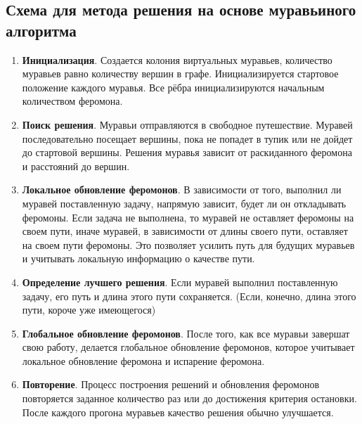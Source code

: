 \documentclass[12pt, a4paper]{article}
\begin{document}
\subsection{Схема для метода решения на основе муравьиного алгоритма}
\begin{enumerate}
	\item \textbf{Инициализация}. Создается колония 
	виртуальных муравьев, количество муравьев 
	равно количеству вершин в графе. 
	Инициализируется стартовое положение каждого 
	муравья. Все рёбра инициализируются начальным 
	количеством феромона.
	\item \textbf{Поиск решения}. Муравьи 
	отправляются в свободное путешествие. Муравей 
	последовательно посещает вершины, пока не 
	попадет в тупик или не дойдет до стартовой 
	вершины. Решения муравья зависит от раскиданного 
	феромона и расстояний до вершин.
	\item \textbf{Локальное обновление феромонов}. В 
	зависимости от того, выполнил ли муравей 
	поставленную задачу, напрямую зависит, будет ли 
	он откладывать феромоны. Если задача не 
	выполнена, то муравей не оставляет феромоны на 
	своем пути, иначе муравей, в зависимости от 
	длины своего пути, оставляет на своем пути 
	феромоны. Это позволяет усилить путь для будущих 
	муравьев и учитывать локальную информацию о 
	качестве пути.
	\item \textbf{Определение лучшего решения}. Если 
	муравей выполнил поставленную задачу, его путь и 
	длина этого пути сохраняется. (Если, конечно, 
	длина этого пути, короче уже имеющегося)
	\item \textbf{Глобальное обновление феромонов}. 
	После того, как все муравьи завершат свою 
	работу, делается глобальное обновление 
	феромонов, которое учитывает локальное 
	обновление феромона и испарение феромона.
	\item \textbf{Повторение}. Процесс построения 
	решений и обновления феромонов повторяется 
	заданное количество раз или до достижения 
	критерия остановки. После каждого прогона 
	муравьев качество решения обычно улучшается.
\end{enumerate}
\end{document}
